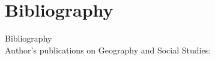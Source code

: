 \documentclass[pdflatex,compress,8pt,
	xcolor={dvipsnames,dvipsnames,svgnames,x11names,table},
	hyperref={	
	breaklinks = true, 
	pdfauthor={Lemenkova Polina}, 
	pdfsubject={Preentation}, 
	pdfcreator={Lemenkova Polina}, 
	pdfproducer={Lemenkova Polina}, 
	colorlinks=true,
	linkcolor=NavyBlue, 
	citecolor=NavyBlue, 
	urlcolor = NavyBlue, 
	breaklinks = true}]{beamer}
\begin{document}
\section{Bibliography}

\Large{Bibliography}\\
\footnotesize{Author's publications on Geography and Social Studies:}\\
	\nocite{*}
	\printbibliography[heading=none]
\end{document}
